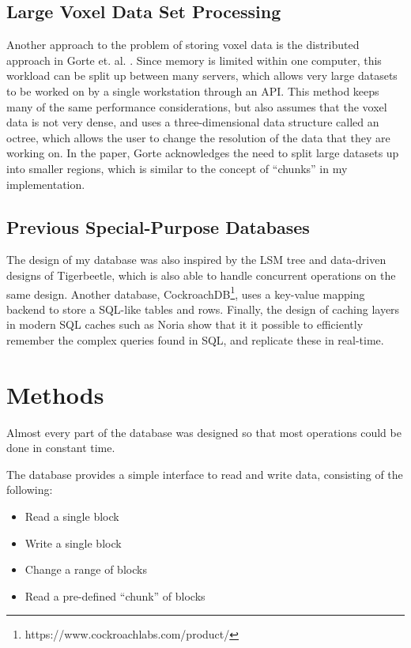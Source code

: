 \documentclass[10pt,twocolumn]{article}
\begin{document}
\subsection{Large Voxel Data Set Processing}

Another approach to the problem of storing voxel data is the distributed
approach in Gorte et. al. \cite{gorte2023analysis}. Since memory is limited
within one computer, this workload can be split up between many servers, which
allows very large datasets to be worked on by a single workstation through an
API. This method keeps many of the same performance considerations, but also
assumes that the voxel data is not very dense, and uses a three-dimensional
data structure called an octree, which allows the user to change the resolution
of the data that they are working on. In the paper, Gorte acknowledges the need
to split large datasets up into smaller regions, which is similar to the concept
of ``chunks'' in my implementation.

\subsection{Previous Special-Purpose Databases}

The design of my database was also inspired by the LSM tree and data-driven
designs of Tigerbeetle\cite{tigerbeetleDesign}, which is also able to handle
concurrent operations on the same design. Another database,
CockroachDB\footnote{https://www.cockroachlabs.com/product/}, uses a key-value
mapping backend to store a SQL-like tables and rows. Finally, the design of
caching layers in modern SQL caches such as Noria\cite{gjengset2018noria} show
that it it possible to efficiently remember the complex queries found in SQL,
and replicate these in real-time.

\section{Methods}

Almost every part of the database was designed so that most operations could be
done in constant time.

The database provides a simple interface to read and write data, consisting of
the following:
\begin{itemize}
  \item Read a single block
  \item Write a single block
  \item Change a range of blocks
  \item Read a pre-defined ``chunk'' of blocks
\end{itemize}
\end{document}
